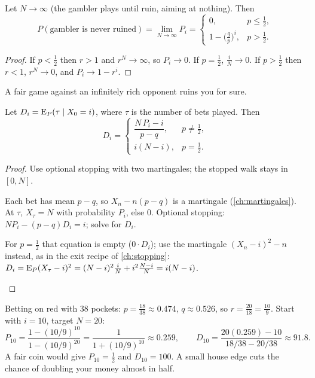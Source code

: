 \begin{result}
\label{res:ruin-limit}
Let $N\to\infty$ (the gambler plays until ruin, aiming at nothing). Then
\[
  P(\text{gambler is never ruined})=\lim_{N\to\infty}P_i=\begin{cases}0,&p\le\frac12,\\ 1-\big(\frac qp\big)^i,&p>\frac12.\end{cases}
\]
\end{result}
\begin{proof}
If $p<\frac12$ then $r>1$ and $r^N\to\infty$, so $P_i\to0$. If $p=\frac12$, $\frac iN\to0$. If $p>\frac12$ then $r<1$, $r^N\to0$, and $P_i\to1-r^i$.
\end{proof}

A fair game against an infinitely rich opponent ruins you for sure.

\begin{result}
\label{res:duration}
Let $D_i=\operatorname{E}_P(\tau\mid X_0=i)$, where $\tau$ is the number of bets played. Then
\[
  D_i=\begin{cases}\dfrac{N\,P_i-i}{p-q},&p\ne\frac12,\\[2ex] i(N-i),&p=\frac12.\end{cases}
\]
\end{result}
\begin{proof}
Use optional stopping with two martingales; the stopped walk stays in $[0,N]$.
\begin{steps}
  \item Each bet has mean $p-q$, so $X_n-n(p-q)$ is a martingale (\cref{ch:martingales}). At $\tau$, $X_\tau=N$ with probability $P_i$, else $0$. Optional stopping: $N P_i-(p-q)D_i=i$; solve for $D_i$.
  \item For $p=\frac12$ that equation is empty ($0\cdot D_i$); use the martingale $(X_n-i)^2-n$ instead, as in the exit recipe of \cref{ch:stopping}: $D_i=\operatorname{E}_P(X_\tau-i)^2=(N-i)^2\frac iN+i^2\frac{N-i}{N}=i(N-i)$. \qedhere
\end{steps}
\end{proof}

\begin{example}[Roulette]
\label{ex:roulette}
Betting on red with 38 pockets: $p=\frac{18}{38}\approx0.474$, $q\approx0.526$, so $r=\frac{20}{18}=\frac{10}{9}$. Start with $i=10$, target $N=20$:
\[
  P_{10}=\frac{1-(10/9)^{10}}{1-(10/9)^{20}}=\frac{1}{1+(10/9)^{10}}\approx0.259,\qquad
  D_{10}=\frac{20(0.259)-10}{18/38-20/38}\approx91.8 .
\]
A fair coin would give $P_{10}=\frac12$ and $D_{10}=100$. A small house edge cuts the chance of doubling your money almost in half.
\end{example}

